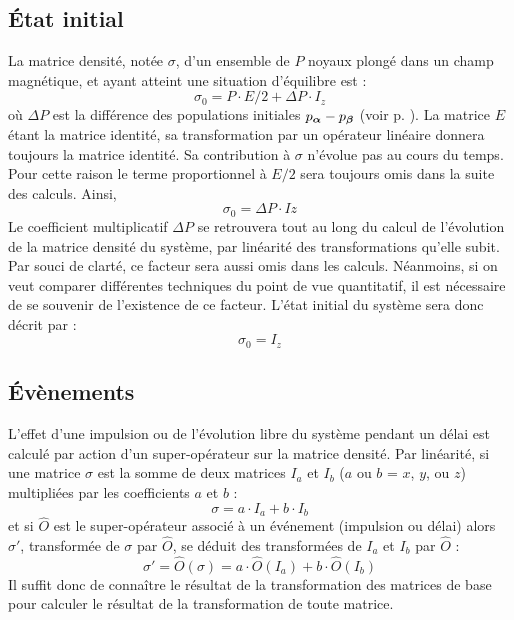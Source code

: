 \subsection{État initial}
La matrice densité, notée $\sigma$, d'un ensemble de $P$ noyaux plongé dans un champ magnétique, 
et ayant atteint une situation d'équilibre est :
\begin{equation}
\sigma_0 = P \cdot E/2 + \Delta P \cdot I_z
\end{equation}
où $\Delta P$ est la différence des populations initiales $p_{\boldsymbol{\alpha}} - p_{\boldsymbol{\beta}}$ 
(voir p. \pageref{page:population}). 
La matrice $E$ étant la matrice identité, sa transformation par un opérateur linéaire
donnera toujours la matrice identité.
Sa contribution à $\sigma$ n'évolue pas au cours du temps.
Pour cette raison le terme proportionnel à $E/2$ sera toujours omis 
dans la suite des calculs. 
Ainsi,
\begin{equation}
\sigma_0 = \Delta P \cdot Iz
\end{equation}
Le coefficient multiplicatif $\Delta P$ se retrouvera tout au long du calcul de l'évolution
de la matrice densité du système, par linéarité des transformations qu'elle subit. 
Par souci de clarté, ce facteur sera aussi omis dans les calculs. 
Néanmoins, si on veut comparer différentes techniques du point de vue quantitatif, 
il est nécessaire de se souvenir de l'existence de ce facteur.
L'état initial du système sera donc décrit par :
\begin{equation}
\sigma_0 = I_z
\end{equation}

\subsection{Évènements}
\label{sec:evenements}
L'effet d'une impulsion ou de l'évolution libre du système pendant un délai
est calculé par action d'un super-opérateur sur la matrice densité. 
Par linéarité, si une matrice $\sigma$ est la somme de deux matrices
$I_a$ et $I_b$ ($a$ ou $b$ = $x$, $y$, ou $z$) multipliées par les 
coefficients $a$ et $b$ :
\begin{equation}
\sigma =  a \cdot I_a + b \cdot I_b
\end{equation}
et si $\hat{O}$ est le super-opérateur associé à un événement 
(impulsion ou délai) alors $\sigma'$, transformée de $\sigma$ par $\hat{O}$, 
se déduit des transformées de $I_a$ et $I_b$ par $\hat{O}$ :
\begin{equation}
\sigma' = \hat{O}(\sigma) = a \cdot \hat{O}(I_a) + b \cdot \hat{O}(I_b)
\end{equation}
Il suffit donc de connaître le résultat de la transformation des matrices de base pour 
calculer le résultat de la transformation de toute matrice.

